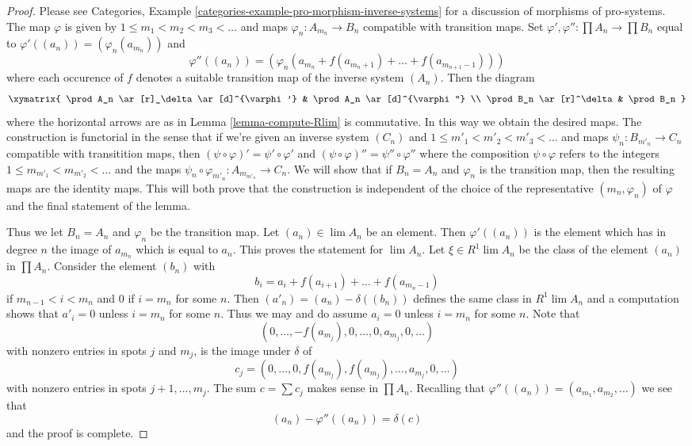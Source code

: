 \begin{proof}
Please see
Categories, Example \ref{categories-example-pro-morphism-inverse-systems}
for a discussion of morphisms of pro-systems.
The map $\varphi$ is given by $1 \leq m_1 < m_2 < m_3 < \ldots$
and maps $\varphi_n : A_{m_n} \to B_n$ compatible with transition
maps. Set $\varphi', \varphi'' : \prod A_n \to \prod B_n$
equal to
$\varphi'((a_n)) = (\varphi_n(a_{m_n}))$ and
$$
\varphi''((a_n)) =
(\varphi_n(a_{m_n} + f(a_{m_n + 1}) + \ldots + f(a_{m_{n + 1} - 1})))
$$
where each occurence of $f$ denotes a suitable transition map of
the inverse system $(A_n)$. Then the diagram
$$
\xymatrix{
\prod A_n \ar[r]_\delta \ar[d]^{\varphi'} &
\prod A_n \ar[d]^{\varphi''} \\
\prod B_n \ar[r]^\delta & \prod B_n
}
$$
where the horizontal arrows are as in Lemma \ref{lemma-compute-Rlim}
is commutative. In this way we obtain the desired maps. The construction
is functorial in the sense that if we're given an inverse system $(C_n)$
and $1 \leq m'_1 < m'_2 < m'_3 < \ldots$ and maps $\psi_n : B_{m'_n} \to C_n$
compatible with transitition maps, then
$(\psi \circ \varphi)' = \psi' \circ \varphi'$ and
$(\psi \circ \varphi)'' = \psi'' \circ \varphi''$
where the composition $\psi \circ \varphi$ refers to the integers
$1 \leq m_{m'_1} < m_{m'_2} < \ldots$ and the maps
$\psi_n \circ \varphi_{m'_n} : A_{m_{m'_n}} \to C_n$. We will show
that if $B_n = A_n$ and $\varphi_n$ is the transition map, then
the resulting maps are the identity maps. This will both prove that
the construction is independent of the choice of the representative
$(m_n, \varphi_n)$ of $\varphi$ and the final statement of the lemma.

\medskip\noindent
Thus we let $B_n = A_n$ and $\varphi_n$ be the transition map.
Let $(a_n) \in \lim A_n$ be an element. Then $\varphi'((a_n))$
is the element which has in degree $n$ the image of $a_{m_n}$
which is equal to $a_n$. This proves the statement for $\lim A_n$.
Let $\xi \in R^1\lim A_n$ be the class of the element
$(a_n)$ in $\prod A_n$. Consider the element $(b_n)$ with
$$
b_i = a_i + f(a_{i + 1}) + \ldots + f(a_{m_n - 1})
$$
if $m_{n - 1} < i < m_n$ and $0$ if $i = m_n$ for some $n$.
Then $(a'_n) = (a_n) - \delta((b_n))$ defines the same class
in $R^1\lim A_n$ and a computation shows that $a'_i = 0$
unless $i = m_n$ for some $n$. Thus we may and do assume $a_i = 0$
unless $i = m_n$ for some $n$. Note that
$$
(0, \ldots, -f(a_{m_j}), 0, \ldots, 0, a_{m_j}, 0, \ldots)
$$
with nonzero entries in spots $j$ and $m_j$, is the image under $\delta$ of
$$
c_j = (0, \ldots, 0, f(a_{m_j}), f(a_{m_j}), \ldots, a_{m_j}, 0, \ldots)
$$
with nonzero entries in spots $j + 1, \ldots, m_j$. The sum
$c = \sum c_j$ makes sense in $\prod A_n$. Recalling that
$\varphi''((a_n)) = (a_{m_1}, a_{m_2}, \ldots)$ we see that
$$
(a_n) - \varphi''((a_n)) = \delta(c)
$$
and the proof is complete.
\end{proof}

